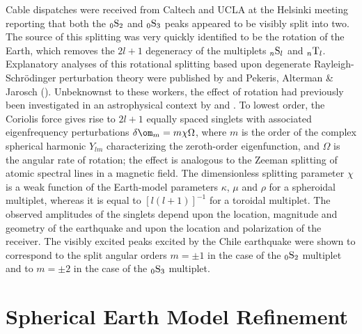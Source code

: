 Cable dispatches were received from Caltech
and UCLA at the Helsinki meeting reporting that
both the ${}_0{\rm S}_2$ and ${}_0{\rm S}_3$ peaks
appeared to be visibly split into two.
The source of this splitting was very
quickly identified to be the rotation of the Earth,
which removes the $2l+1$ degeneracy of the
multiplets ${}_n{\rm S}_l$ and ${}_n{\rm T}_l$.
Explanatory analyses of this rotational splitting based upon
degenerate Rayleigh-Schr\"{o}dinger perturbation theory
were published by \textcite{backus&gilbert61} and
Pekeris, Alterman \& Jarosch (\citeyear{pekeris&al61b}).
%
Unbeknownst to these workers, the effect of rotation
had previously been investigated in an astrophysical
context by \textcite{cowling&newing49} and \textcite{ledoux51}.
To lowest order, the Coriolis force gives rise to $2l+1$
equally spaced singlets with associated eigenfrequency
perturbations $\delta\om_m=m\chi\Omega$, where $m$
is the order of the complex spherical harmonic $Y_{lm}$
characterizing the zeroth-order eigenfunction,
and $\Omega$ is the angular rate of rotation;
the effect is analogous to the Zeeman
splitting of atomic spectral lines in a magnetic field.
The dimensionless splitting parameter $\chi$ is a weak
function of the Earth-model parameters
$\kappa$, $\mu$ and $\rho$ for a spheroidal multiplet,
whereas it is equal to $[l(l+1)]^{-1}$ for a toroidal multiplet.
The observed amplitudes of the singlets depend upon the
location, magnitude and geometry of the earthquake
and upon the location and polarization of the receiver.
The visibly excited peaks excited by the Chile earthquake
were shown to correspond to the split angular orders
$m=\pm 1$ in the case of the ${}_0{\rm S}_2$ multiplet and to
$m=\pm 2$ in the case of the ${}_0{\rm S}_3$ multiplet.
%

\section{Spherical Earth Model Refinement}

